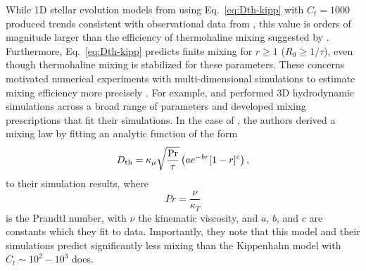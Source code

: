 While 1D stellar evolution models from \citet{charbonnel_thermohaline_2007} using Eq.~\eqref{eq:Dth-kipp} with $C_t = 1000$ produced trends consistent with observational data from \citet{Gratton2000}, this value is orders of magnitude larger than the efficiency of thermohaline mixing suggested by \citet{kippenhahn_etal_1980}. 
Furthermore, Eq.~\eqref{eq:Dth-kipp} predicts finite mixing for $r \geq 1$ ($R_0 \geq 1/\tau$), even though thermohaline mixing is stabilized for these parameters. 
These concerns motivated numerical experiments with multi-dimensional simulations to estimate mixing efficiency more precisely \citep{Denissenkov2010thermohaline,traxler_etal_2011}. 
For example, \citet{traxler_etal_2011} and \citet{brown_etal_2013} performed 3D hydrodynamic simulations across a broad range of parameters and developed mixing prescriptions that fit their simulations. 
In the case of \citet{traxler_etal_2011}, the authors derived a mixing law by fitting an
analytic function 
of the form
\begin{equation} \label{eqn:trax_model}
   \Dth = \kappa_{\mu}\sqrt{\frac{\mathrm{Pr}}{\tau}}\left(a e^{-br}[1 - r]^c\right),
\end{equation}
to their simulation results,
where 
\begin{equation} \label{eq:Prandtl}
    Pr = \frac{\nu}{\kappa_T}
\end{equation}
is the Prandtl number, with $\nu$ the kinematic viscosity,
%
and $a$, $b$, and $c$ are constants which they fit to data. 
Importantly, they note that this model and their simulations predict significantly less mixing than the Kippenhahn model with $C_t \sim 10^2 - 10^3$ does.

